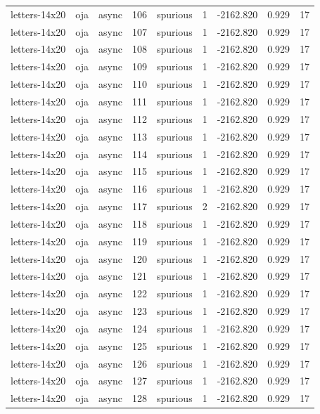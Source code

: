 \begin{tabular}{lllrlrrrr}
letters-14x20 & oja & async & 106 & spurious & 1 & -2162.820 & 0.929 & 17 \\
letters-14x20 & oja & async & 107 & spurious & 1 & -2162.820 & 0.929 & 17 \\
letters-14x20 & oja & async & 108 & spurious & 1 & -2162.820 & 0.929 & 17 \\
letters-14x20 & oja & async & 109 & spurious & 1 & -2162.820 & 0.929 & 17 \\
letters-14x20 & oja & async & 110 & spurious & 1 & -2162.820 & 0.929 & 17 \\
letters-14x20 & oja & async & 111 & spurious & 1 & -2162.820 & 0.929 & 17 \\
letters-14x20 & oja & async & 112 & spurious & 1 & -2162.820 & 0.929 & 17 \\
letters-14x20 & oja & async & 113 & spurious & 1 & -2162.820 & 0.929 & 17 \\
letters-14x20 & oja & async & 114 & spurious & 1 & -2162.820 & 0.929 & 17 \\
letters-14x20 & oja & async & 115 & spurious & 1 & -2162.820 & 0.929 & 17 \\
letters-14x20 & oja & async & 116 & spurious & 1 & -2162.820 & 0.929 & 17 \\
letters-14x20 & oja & async & 117 & spurious & 2 & -2162.820 & 0.929 & 17 \\
letters-14x20 & oja & async & 118 & spurious & 1 & -2162.820 & 0.929 & 17 \\
letters-14x20 & oja & async & 119 & spurious & 1 & -2162.820 & 0.929 & 17 \\
letters-14x20 & oja & async & 120 & spurious & 1 & -2162.820 & 0.929 & 17 \\
letters-14x20 & oja & async & 121 & spurious & 1 & -2162.820 & 0.929 & 17 \\
letters-14x20 & oja & async & 122 & spurious & 1 & -2162.820 & 0.929 & 17 \\
letters-14x20 & oja & async & 123 & spurious & 1 & -2162.820 & 0.929 & 17 \\
letters-14x20 & oja & async & 124 & spurious & 1 & -2162.820 & 0.929 & 17 \\
letters-14x20 & oja & async & 125 & spurious & 1 & -2162.820 & 0.929 & 17 \\
letters-14x20 & oja & async & 126 & spurious & 1 & -2162.820 & 0.929 & 17 \\
letters-14x20 & oja & async & 127 & spurious & 1 & -2162.820 & 0.929 & 17 \\
letters-14x20 & oja & async & 128 & spurious & 1 & -2162.820 & 0.929 & 17 \\

\end{tabular}
